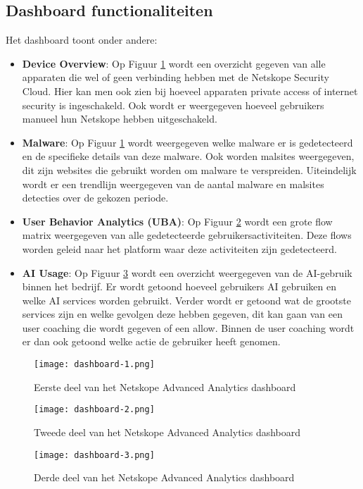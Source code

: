 \subsection{Dashboard functionaliteiten}
Het dashboard toont onder andere:
\begin{itemize}
    \item \textbf{Device Overview}: Op Figuur \ref{fig:dashboard-1} wordt een overzicht gegeven van alle apparaten die wel of geen verbinding hebben met de Netskope Security Cloud. Hier kan men ook zien bij hoeveel apparaten private access of internet security is ingeschakeld. Ook wordt er weergegeven hoeveel gebruikers manueel hun Netskope hebben uitgeschakeld.
    \item \textbf{Malware}: Op Figuur \ref{fig:dashboard-1} wordt weergegeven welke malware er is gedetecteerd en de specifieke details van deze malware. Ook worden malsites weergegeven, dit zijn websites die gebruikt worden om malware te verspreiden. Uiteindelijk wordt er een trendlijn weergegeven van de aantal malware en malsites detecties over de gekozen periode.
    \item \textbf{User Behavior Analytics (UBA)}: Op Figuur \ref{fig:dashboard-2} wordt een grote flow matrix weergegeven van alle gedetecteerde gebruikersactiviteiten. Deze flows worden geleid naar het platform waar deze activiteiten zijn gedetecteerd.
    \item \textbf{AI Usage}: Op Figuur \ref{fig:dashboard-3} wordt een overzicht weergegeven van de AI-gebruik binnen het bedrijf. Er wordt getoond hoeveel gebruikers AI gebruiken en welke AI services worden gebruikt. Verder wordt er getoond wat de grootste services zijn en welke gevolgen deze hebben gegeven, dit kan gaan van een user coaching die wordt gegeven of een allow. Binnen de user coaching wordt er dan ook getoond welke actie de gebruiker heeft genomen.
\end{itemize}

\begin{figure}[h!]
    \centering
    \texttt{[image: dashboard-1.png]}
    \caption[Netskope Advanced Analytics dashboard - Deel 1]{Eerste deel van het Netskope Advanced Analytics dashboard}
    \label{fig:dashboard-1}
\end{figure}
\begin{figure}[h!]
    \centering
    \texttt{[image: dashboard-2.png]}
    \caption[Netskope Advanced Analytics dashboard - Deel 2]{Tweede deel van het Netskope Advanced Analytics dashboard}
    \label{fig:dashboard-2}
\end{figure}
\begin{figure}[h!]
    \centering
    \texttt{[image: dashboard-3.png]}
    \caption[Netskope Advanced Analytics dashboard - Deel 3]{Derde deel van het Netskope Advanced Analytics dashboard}
    \label{fig:dashboard-3}
\end{figure}

